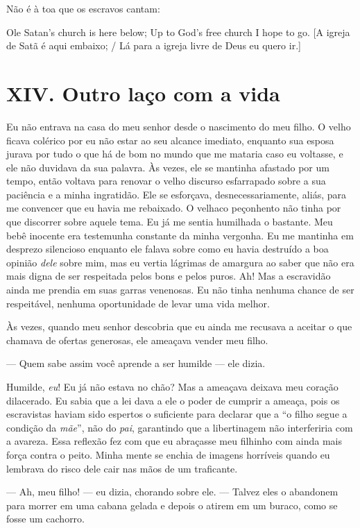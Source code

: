 Não é à toa que os escravos cantam:

Ole Satan's church is here below; Up to God's free church I hope to go.
{[}A igreja de Satã
é aqui embaixo; / Lá para a igreja livre de Deus eu quero ir.{]}

\chapter{XIV. Outro laço com a
vida}

Eu não entrava na casa do meu senhor
desde o nascimento do meu filho. O velho ficava colérico por eu não
estar ao seu alcance imediato, enquanto sua esposa jurava por tudo o que
há de bom no mundo que me mataria caso eu voltasse, e ele não duvidava
da sua palavra. Às vezes, ele se mantinha afastado por um tempo, então
voltava para renovar o velho discurso esfarrapado sobre a sua paciência
e a minha ingratidão. Ele se esforçava, desnecessariamente, aliás, para
me convencer que eu havia me rebaixado. O velhaco peçonhento não tinha
por que discorrer sobre aquele tema. Eu já me sentia humilhada o
bastante. Meu bebê inocente era testemunha constante da minha vergonha.
Eu me mantinha em desprezo silencioso enquanto ele falava sobre como eu
havia destruído a boa opinião \emph{dele} sobre mim, mas eu vertia
lágrimas de amargura ao saber que não era mais digna de ser respeitada
pelos bons e pelos puros. Ah! Mas a escravidão ainda me prendia em suas
garras venenosas. Eu não tinha nenhuma chance de ser respeitável,
nenhuma oportunidade de levar uma vida melhor.

Às vezes, quando meu senhor descobria
que eu ainda me recusava a aceitar o que chamava de ofertas generosas,
ele ameaçava vender meu filho.

--- Quem sabe assim você aprende a ser humilde --- ele dizia.

Humilde, \emph{eu}! Eu já não estava no
chão? Mas a ameaçava deixava meu coração dilacerado. Eu sabia que a lei
dava a ele o poder de cumprir a ameaça, pois os escravistas haviam sido
espertos o suficiente para declarar que a ``o filho segue a condição da
\emph{mãe}'', não do \emph{pai}, garantindo que a libertinagem não
interferiria com a avareza. Essa reflexão fez com que eu abraçasse meu
filhinho com ainda mais força contra o peito. Minha mente se enchia de
imagens horríveis quando eu lembrava do risco dele cair nas mãos de um
traficante.

--- Ah, meu filho! --- eu dizia, chorando sobre ele. --- Talvez eles o
abandonem para morrer em uma cabana gelada e depois o atirem em um
buraco, como se fosse um cachorro.

